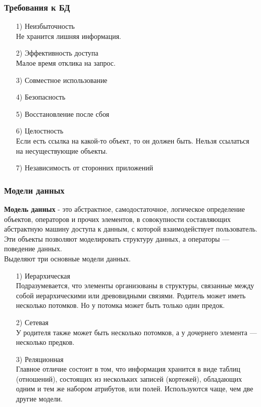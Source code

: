 	\subsubsection{Требования к БД}
	\begin{enumerate}
		\item[1)] Неизбыточность \\
		Не хранится лишняя информация.
		\item[2)] Эффективность доступа \\
		Малое время отклика на запрос.
		\item[3)] Совместное использование
		\item[4)] Безопасность
		\item[5)] Восстановление после сбоя
		\item[6)] Целостность \\
		Если есть ссылка на какой-то объект, то он должен быть. Нельзя ссылаться на несуществующие объекты.
		\item[7)] Независимость от сторонних приложений
	\end{enumerate}

	\subsubsection{Модели данных}
	\textbf{Модель данных} - это абстрактное, самодостаточное, логическое определение объектов, операторов и прочих элементов, в совокупности составляющих абстрактную машину доступа к данным, с которой взаимодействует пользователь. Эти объекты позволяют моделировать структуру данных, а операторы — поведение данных. \cite{db} \\
	
	Выделяют три основные модели данных.
	\begin{enumerate}
		\item[1)] Иерархическая \\
		Подразумевается, что элементы организованы в структуры, связанные между собой иерархическими или древовидными связями. Родитель может иметь несколько потомков. Но у потомка может быть только один предок.
		\item[2)] Сетевая \\
		У родителя также может быть несколько потомков, а у дочернего элемента — несколько предков.
		\item[3)] Реляционная \\
		Главное отличие состоит в том, что информация хранится в виде таблиц (отношений), состоящих из нескольких записей (кортежей), обладающих одним и тем же набором атрибутов, или полей. Используются чаще, чем две другие модели.
	\end{enumerate}

